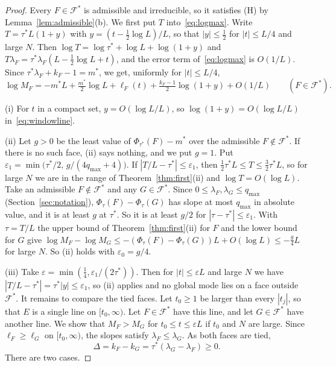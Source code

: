 \begin{proof}
Every $F\in\mathcal F^*$ is admissible and irreducible, so it satisfies (H) by
Lemma~\ref{lem:admissible}(b). We first put $T$ into~\eqref{eq:logmax}. Write
$T=\tau^*L(1+y)$ with $y=(t-\frac12\log L)/L$, so that $|y|\le\frac12$ for $|t|\le L/4$ and
large $N$. Then $\log T=\log\tau^*+\log L+\log(1+y)$ and
$T\lambda_F=\tau^*\lambda_F(L-\frac12\log L+t)$, and the error term of~\eqref{eq:logmax} is
$O(1/L)$. Since $\tau^*\lambda_F+k_F-1=m^*$, we get, uniformly for $|t|\le L/4$,
\begin{equation}\label{eq:windowline}
\log M_F=-m^*L+\tfrac{m^*}2\log L+\ell_F(t)+\tfrac{k_F-1}2\log(1+y)+O(1/L)
\qquad(F\in\mathcal F^*).
\end{equation}

(i) For $t$ in a compact set, $y=O(\log L/L)$, so $\log(1+y)=O(\log L/L)$
in~\eqref{eq:windowline}.

(ii) Let $g>0$ be the least value of $\Phi_{\tau^*}(F)-m^*$ over the admissible
$F\notin\mathcal F^*$. If there is no such face, (ii) says nothing, and we put $g=1$. Put
$\varepsilon_1=\min\bigl(\tau^*/2,\,g/(4q_{\max}+4)\bigr)$. If $|T/L-\tau^*|\le\varepsilon_1$, then
$\frac12\tau^*L\le T\le\frac32\tau^*L$, so for large $N$ we are in the range of
Theorem~\ref{thm:first}(ii) and $\log T=O(\log L)$. Take an admissible $F\notin\mathcal F^*$ and
any $G\in\mathcal F^*$. Since $0\le\lambda_F,\lambda_G\le q_{\max}$
(Section~\ref{sec:notation}), $\Phi_\tau(F)-\Phi_\tau(G)$ has slope at most $q_{\max}$ in
absolute value, and it is at least $g$ at $\tau^*$. So it is at least $g/2$ for
$|\tau-\tau^*|\le\varepsilon_1$. With $\tau=T/L$ the
upper bound of Theorem~\ref{thm:first}(ii) for $F$ and the lower bound for $G$ give
$\log M_F-\log M_G\le-(\Phi_\tau(F)-\Phi_\tau(G))L+O(\log L)\le-\frac g4L$ for large $N$. So (ii)
holds with $\varepsilon_0=g/4$.

(iii) Take $\varepsilon=\min(\frac14,\varepsilon_1/(2\tau^*))$. Then for $|t|\le\varepsilon L$
and large $N$ we have $|T/L-\tau^*|=\tau^*|y|\le\varepsilon_1$, so (ii) applies and no global
mode lies on a face outside $\mathcal F^*$. It remains to compare the tied faces. Let $t_0\ge1$
be larger than every $|t_j|$, so that $E$ is a single line on $[t_0,\infty)$. Let
$F\in\mathcal F^*$ have this line, and let $G\in\mathcal F^*$ have another line. We show that
$M_F>M_G$ for $t_0\le t\le\varepsilon L$ if $t_0$ and $N$ are large. Since $\ell_F\ge\ell_G$
on $[t_0,\infty)$, the slopes satisfy $\lambda_F\le\lambda_G$. As both faces are tied,
\[
\Delta=k_F-k_G=\tau^*(\lambda_G-\lambda_F)\ge0 .
\]
There are two cases.


\end{proof}
